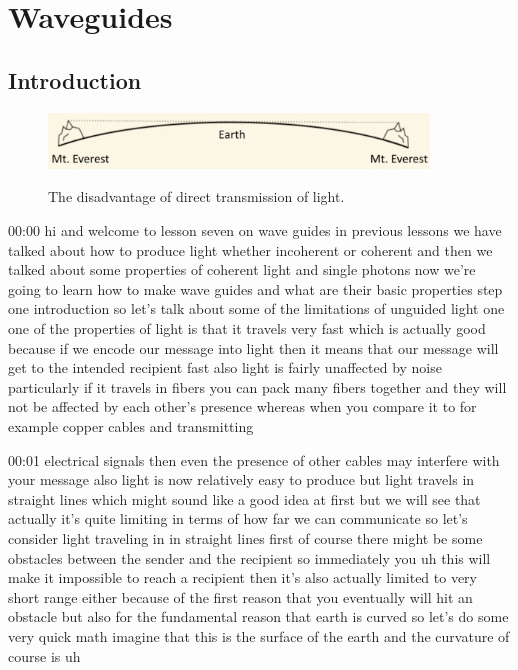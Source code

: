 \chapter{Waveguides}

\section{Introduction}

\begin{figure}[H]
    \centering
    \includegraphics[width=0.9\textwidth]{lesson7/everest.pdf}
    \label{図: 1}
    \caption{The disadvantage of direct transmission of light.}
\end{figure}


00:00
hi and welcome to lesson seven on wave guides
in previous lessons we have talked about how to produce light whether
incoherent or coherent and then we talked about some properties
of coherent light and single photons now we're going to
learn how to make wave guides and what are their basic properties
step one introduction so let's talk about some of the limitations of
unguided light one one of the properties of light is that it travels very fast
which is actually good because if we encode our message
into light then it means that our message will get to the
intended recipient fast also light is fairly unaffected by noise
particularly if it travels in fibers you can pack many fibers together and
they will not be affected by each other's presence
whereas when you compare it to for example copper cables and transmitting

00:01
electrical signals then even the presence of other cables
may interfere with your message also light is now relatively easy to produce
but light travels in straight lines which might sound like a good idea at first
but we will see that actually it's quite limiting in terms of how far
we can communicate so let's consider light traveling in in straight lines
first of course there might be some obstacles between the sender
and the recipient so immediately you uh this will make
it impossible to reach a recipient then it's also actually limited to very
short range either because of the first reason that
you eventually will hit an obstacle but also for the fundamental reason that
earth is curved so let's do some very quick math imagine that this is the
surface of the earth and the curvature of course is uh

